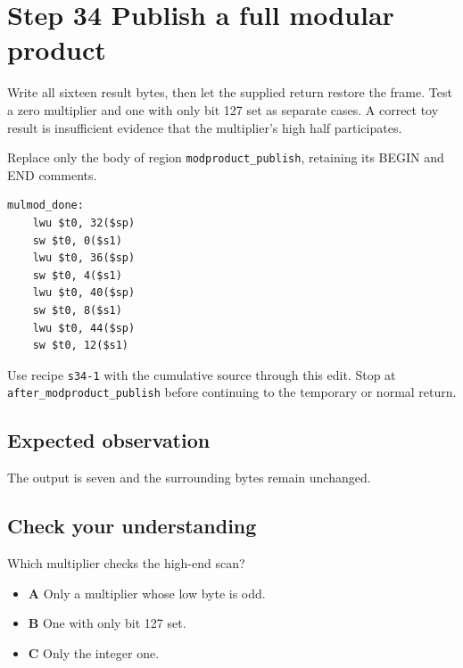 \section{Step 34 Publish a full modular product}\label{rsa-s34}

Write all sixteen result bytes, then let the supplied return restore the frame. Test a zero multiplier and one with only bit 127 set as separate cases. A correct toy result is insufficient evidence that the multiplier's high half participates.

Replace only the body of region \texttt{modproduct\_publish}, retaining its BEGIN and END comments.

\begin{verbatim}
mulmod_done:
    lwu $t0, 32($sp)
    sw $t0, 0($s1)
    lwu $t0, 36($sp)
    sw $t0, 4($s1)
    lwu $t0, 40($sp)
    sw $t0, 8($s1)
    lwu $t0, 44($sp)
    sw $t0, 12($s1)
\end{verbatim}

Use recipe \texttt{s34-1} with the cumulative source through this edit. Stop at \texttt{after\_modproduct\_publish} before continuing to the temporary or normal return.

\subsection{Expected observation}
The output is seven and the surrounding bytes remain unchanged.

\subsection{Check your understanding}
Which multiplier checks the high-end scan?

\begin{itemize}
  \item \textbf{A} Only a multiplier whose low byte is odd.
  \item \textbf{B} One with only bit 127 set.
  \item \textbf{C} Only the integer one.
\end{itemize}
